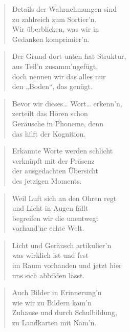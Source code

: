 \documentclass[10pt,a4paper]{article}
\begin{document}
\begin{paracol}{2}
\begin{verse}
Details der Wahrnehmungen sind \\
zu zahlreich zum Sortier’n. \\
Wir überblicken, was wir in \\
Gedanken komprimier’n. \\
\end{verse}

\begin{verse}
Der Grund dort unten hat Struktur, \\
aus Teil’n zusamm’ngefügt, \\
doch nennen wir das alles nur \\
den „Boden“, das genügt. \\
\end{verse}

\begin{verse}
Bevor wir dieses… Wort… erkenn’n, \\
zerteilt das Hören schon \\
Geräusche in Phoneme, denn \\
das hilft der Kognition. \\
\end{verse}

\begin{verse}
Erkannte Worte werden schlicht \\
verknüpft mit der Präsenz \\
der ausgedachten Übersicht \\
des jetzigen Moments. \\
\end{verse}

\begin{verse}
Weil Luft sich an den Ohren regt \\
und Licht in Augen fällt \\
begreifen wir die unentwegt \\
vorhand’ne echte Welt. \\
\end{verse}

\begin{verse}
Licht und Geräusch artikulier’n \\
was wirklich ist und fest \\
im Raum vorhanden und jetzt hier \\
uns sich abbilden lässt. \\
\end{verse}

\begin{verse}
Auch Bilder in Erinnerung’n \\
wie wir zu Bildern kam’n \\
Zuhause und durch Schulbildung, \\
zu Landkarten mit Nam’n. \\
\end{verse}


\end{paracol}
\end{document}

